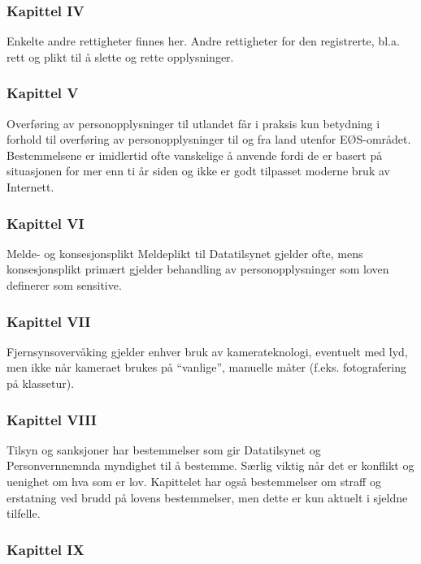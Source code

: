 \documentclass[11pt]{article}
\begin{document}
\subsubsection{Kapittel IV}
\label{sec-18.2.4}

    Enkelte andre rettigheter finnes her. Andre rettigheter for den registrerte,
    bl.a. rett og plikt til å slette og rette opplysninger.
\subsubsection{Kapittel V}
\label{sec-18.2.5}

    Overføring av personopplysninger til utlandet får i praksis kun betydning
    i forhold til overføring av personopplysninger til og fra land utenfor EØS-området. 
    Bestemmelsene er imidlertid ofte vanskelige å anvende fordi de er basert på situasjonen
    for mer enn ti år siden og ikke er godt tilpasset moderne bruk av Internett.
\subsubsection{Kapittel VI}
\label{sec-18.2.6}

    Melde- og konsesjonsplikt Meldeplikt til Datatilsynet gjelder ofte, mens konsesjonsplikt 
    primært gjelder behandling av personopplysninger som loven definerer som sensitive.
\subsubsection{Kapittel VII}
\label{sec-18.2.7}

    Fjernsynsovervåking gjelder enhver bruk av kamerateknologi, eventuelt med lyd, men
    ikke når kameraet brukes på ``vanlige'', manuelle måter (f.eks. fotografering på 
    klassetur).
\subsubsection{Kapittel VIII}
\label{sec-18.2.8}

    Tilsyn og sanksjoner har bestemmelser som gir Datatilsynet og Personvernnemnda
    myndighet til å bestemme. Særlig viktig når det er konflikt og uenighet om hva 
    som er lov. Kapittelet har også bestemmelser om straff og erstatning ved brudd
    på lovens bestemmelser, men dette er kun aktuelt i sjeldne tilfelle.
\subsubsection{Kapittel IX}
\label{sec-18.2.9}
\end{document}
